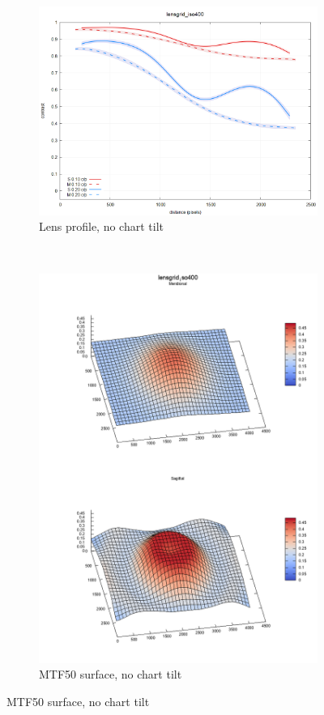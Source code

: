 \documentclass[a4paper]{article}
\begin{document}
\begin{figure}[!ht]
\centering
\begin{subfigure}[b]{0.5\textwidth}
    \includegraphics[width=\textwidth]{figures/lg_exmple_flat_lensgrid.png}
    \caption{Lens profile, no chart tilt}
\end{subfigure}
$\quad$
\begin{subfigure}[b]{0.25\textwidth}
    \includegraphics[width=\textwidth]{figures/lg_exmple_flat_surface.png}
    \caption{MTF50 surface, no chart tilt}
\end{subfigure}


\end{figure}
\end{document}
